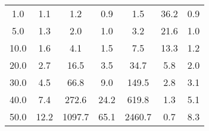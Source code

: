 \begin{tabular}{c | c | c | c | c | c | c}
1.0 & 1.1 & 1.2 & 0.9 & 1.5 & 36.2 & 0.9 \\
5.0 & 1.3 & 2.0 & 1.0 & 3.2 & 21.6 & 1.0 \\
10.0 & 1.6 & 4.1 & 1.5 & 7.5 & 13.3 & 1.2 \\
20.0 & 2.7 & 16.5 & 3.5 & 34.7 & 5.8 & 2.0 \\
30.0 & 4.5 & 66.8 & 9.0 & 149.5 & 2.8 & 3.1 \\
40.0 & 7.4 & 272.6 & 24.2 & 619.8 & 1.3 & 5.1 \\
50.0 & 12.2 & 1097.7 & 65.1 & 2460.7 & 0.7 & 8.3 \\
\end{tabular}